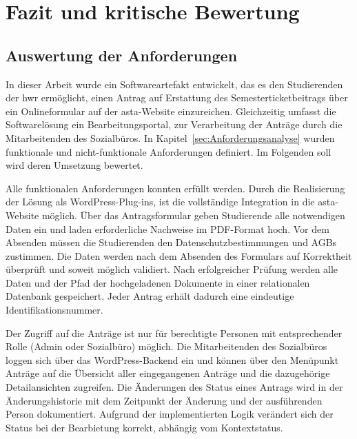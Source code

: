 \chapter{Fazit und kritische Bewertung}\label{cha:Fazit}

\section{Auswertung der Anforderungen}\label{sec:Auswertung}
In dieser Arbeit wurde ein Softwareartefakt entwickelt, das es den Studierenden der \gls{hwr} ermöglicht, einen Antrag auf Erstattung des Semesterticketbeitrags über ein Onlineformular auf der \gls{asta}-Website einzureichen. Gleichzeitig umfasst die Softwarelösung ein Bearbeitungsportal, zur Verarbeitung der Anträge durch die Mitarbeitenden des Sozialbüros. In Kapitel~\ref{sec:Anforderungsanalyse} wurden funktionale und nicht-funktionale Anforderungen definiert. Im Folgenden soll wird deren Umsetzung bewertet.

Alle funktionalen Anforderungen konnten erfüllt werden. Durch die Realisierung der Lösung als WordPress-Plug-ins, ist die vollständige Integration in die \gls{asta}-Website möglich. Über das Antragsformular geben Studierende alle notwendigen Daten ein und laden erforderliche Nachweise im PDF-Format hoch. Vor dem Absenden müssen die Studierenden den Datenschutzbestimmungen und AGBs zustimmen. Die Daten werden nach dem Absenden des Formulars auf Korrektheit überprüft und soweit möglich validiert. Nach erfolgreicher Prüfung werden alle Daten und der Pfad der hochgeladenen Dokumente in einer relationalen Datenbank gespeichert. Jeder Antrag erhält dadurch eine eindeutige Identifikationsnummer. 

Der Zugriff auf die Anträge ist nur für berechtigte Personen mit entsprechender Rolle (Admin oder Sozialbüro) möglich. Die Mitarbeitenden des Sozialbüros loggen sich über das WordPress-Backend ein und können über den Menüpunkt \glqq{}Anträge\grqq{} auf die Übersicht aller eingegangenen Anträge und die dazugehörige Detailansichten zugreifen. Die Änderungen des Status eines Antrags wird in der Änderungshistorie mit dem Zeitpunkt der Änderung und der ausführenden Person dokumentiert. Aufgrund der implementierten Logik verändert sich der Status bei der Bearbietung korrekt, abhängig vom Kontextstatus.

